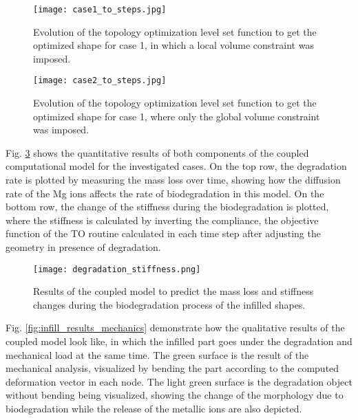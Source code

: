 \begin{figure}[h]
\centering
\medskip
\texttt{[image: case1\_to\_steps.jpg]}
\caption[Evolution of the topology optimization level set function for case 1]{Evolution of the topology optimization level set function to get the optimized shape for case 1, in which a local volume constraint was imposed.} \label{fig:infill_case1_to_steps}
\end{figure}

\begin{figure}[h]
\centering
\medskip
\texttt{[image: case2\_to\_steps.jpg]}
\caption[Evolution of the topology optimization level set function for case 2]{Evolution of the topology optimization level set function to get the optimized shape for case 1, where only the global volume constraint was imposed.} \label{fig:infill_case2_to_steps}
\end{figure}

Fig. \ref{fig:infill_degradation_stiffness} shows the quantitative results of both components of the coupled computational model for the investigated cases. On the top row, the degradation rate is plotted by measuring the mass loss over time, showing how the diffusion rate of the Mg ions affects the rate of biodegradation in this model. On the bottom row, the change of the stiffness during the biodegradation is plotted, where the stiffness is calculated by inverting the compliance, the objective function of the TO routine calculated in each time step after adjusting the geometry in presence of degradation.


\begin{figure}[h]
\centering
\medskip
\texttt{[image: degradation\_stiffness.png]}
\caption[Results of the coupled model to predict the stiffness changes during biodegradation]{Results of the coupled model to predict the mass loss and stiffness changes during the biodegradation process of the infilled shapes.} \label{fig:infill_degradation_stiffness}
\end{figure}

Fig. \ref{fig:infill_results_mechanics} demonstrate how the qualitative results of the coupled model look like, in which the infilled part goes under the degradation and mechanical load at the same time. The green surface is the result of the mechanical analysis, visualized by bending the part according to the computed deformation vector in each node. The light green surface is the degradation object without bending being visualized, showing the change of the morphology due to biodegradation while the release of the metallic ions are also depicted.


